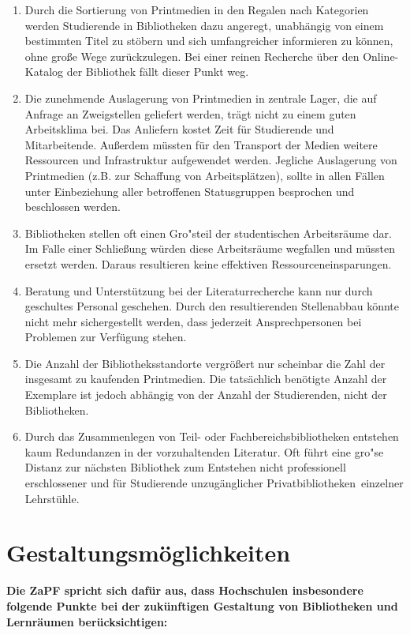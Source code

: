 \documentclass[DIV=calc]{scrartcl}
\begin{document}
\begin{enumerate}
\item Durch die Sortierung von Printmedien in den Regalen nach Kategorien werden Studierende in Bibliotheken dazu angeregt, unabhängig von einem bestimmten Titel zu stöbern und sich umfangreicher informieren zu können, ohne große Wege zurückzulegen.
Bei einer reinen Recherche über den Online-Katalog der Bibliothek fällt dieser Punkt weg.
\item Die zunehmende Auslagerung von Printmedien in zentrale Lager, die auf Anfrage an  Zweigstellen geliefert werden, trägt nicht zu einem guten Arbeitsklima bei.
Das Anliefern kostet Zeit für Studierende und Mitarbeitende.
Außerdem müssten für den Transport der Medien weitere Ressourcen und Infrastruktur aufgewendet werden.
Jegliche Auslagerung von Printmedien (z.B. zur Schaffung von Arbeitsplätzen),  sollte in allen Fällen unter Einbeziehung aller betroffenen Statusgruppen besprochen und beschlossen werden.
\item Bibliotheken stellen oft einen Gro"steil der studentischen Arbeitsr\"aume dar.
Im Falle einer Schließung würden diese Arbeitsräume wegfallen und müssten ersetzt werden.
Daraus resultieren keine effektiven Ressourceneinsparungen.
\item Beratung und Unterstützung bei der Literaturrecherche kann nur durch geschultes Personal geschehen.
Durch den resultierenden Stellenabbau könnte nicht mehr sichergestellt werden, dass jederzeit Ansprechpersonen bei Problemen zur Verfügung stehen.
\item Die Anzahl der Bibliotheksstandorte vergrößert nur scheinbar die Zahl der insgesamt zu kaufenden Printmedien.
Die tatsächlich benötigte Anzahl der Exemplare ist jedoch abhängig von der Anzahl der Studierenden, nicht der Bibliotheken.
\item Durch das Zusammenlegen von Teil- oder Fachbereichsbibliotheken entstehen kaum Redundanzen in der vorzuhaltenden Literatur.
Oft f\"uhrt eine gro"se Distanz zur n\"achsten Bibliothek zum Entstehen nicht professionell erschlossener und f\"ur Studierende unzug\"anglicher \glqq Privatbibliotheken\grqq\ einzelner Lehrst\"uhle.
\end{enumerate}

\section{Gestaltungsmöglichkeiten}

\textbf{Die ZaPF spricht sich dafür aus, dass Hochschulen insbesondere folgende Punkte bei der zukünftigen Gestaltung von Bibliotheken und Lernräumen berücksichtigen:} \\
\end{document}

